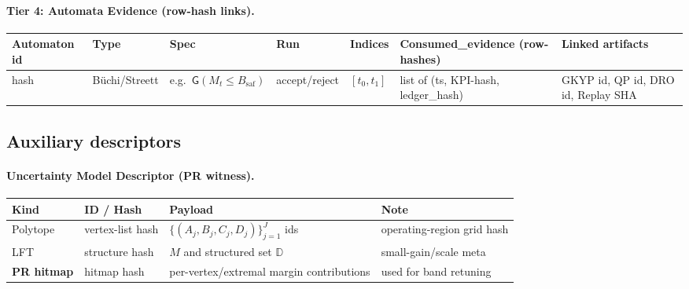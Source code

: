 \documentclass[10pt]{article}
\begin{document}
\paragraph{Tier 4: Automata Evidence (row-hash links).}
\begin{center}
\renewcommand{\arraystretch}{1.12}
\begin{tabularx}{\textwidth}{@{} l l l l X X X @{}}
\toprule
\textbf{Automaton id} & \textbf{Type} & \textbf{Spec} & \textbf{Run} & \textbf{Indices} & \textbf{Consumed\_evidence (row-hashes)} & \textbf{Linked artifacts} \\
\midrule
hash & Büchi/Streett & e.g.\ $\textsf{G}(M_t\le B_{\mathrm{saf}})$ & accept/reject & $[t_0,t_1]$ & list of (ts, KPI-hash, ledger\_hash) & GKYP id, QP id, DRO id, Replay SHA \\
\bottomrule
\end{tabularx}
\end{center}

\subsection{Auxiliary descriptors}

\paragraph{Uncertainty Model Descriptor (PR witness).}
\begin{center}
\renewcommand{\arraystretch}{1.12}
\begin{tabularx}{\textwidth}{@{} l l X X @{}}
\toprule
\textbf{Kind} & \textbf{ID / Hash} & \textbf{Payload} & \textbf{Note} \\
\midrule
Polytope & vertex-list hash & $\{(A_j,B_j,C_j,D_j)\}_{j=1}^J$ ids & operating-region grid hash \\
LFT & structure hash & $M$ and structured set $\mathbb D$ & small-gain/scale meta \\
\textbf{PR hitmap} & hitmap hash & per-vertex/extremal margin contributions & used for band retuning \\
\bottomrule
\end{tabularx}
\end{center}
\end{document}
